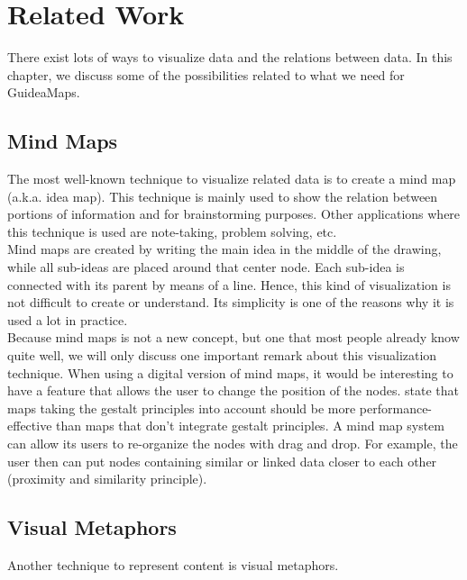 \chapter{Related Work}\label{ch:related-work}

There exist lots of ways to visualize data and the relations between data. In this chapter, we discuss some of the possibilities related to what we need for GuideaMaps.

\section{Mind Maps}
The most well-known technique to visualize related data is to create a mind map (a.k.a. idea map). This technique is mainly used to show the relation between portions of information and for brainstorming purposes. Other applications where this technique is used are note-taking, problem solving, etc. \citep{knowledgemapsbalaid} \\

Mind maps are created by writing the main idea in the middle of the drawing, while all sub-ideas are placed around that center node. Each sub-idea is connected with its parent by means of a line. Hence, this kind of visualization is not difficult to create or understand. Its simplicity is one of the reasons why it is used a lot in practice.\\

Because mind maps is not a new concept, but one that most people already know quite well, we will only discuss one important remark about this visualization technique. When using a digital version of mind maps, it would be interesting to have a feature that allows the user to change the position of the nodes. \cite{wiegmann-1992} state that maps taking the gestalt principles into account should be more performance-effective than maps that don't integrate gestalt principles. A mind map system can allow its users to re-organize the nodes with drag and drop. For example, the user then can put nodes containing similar or linked data closer to each other (proximity and similarity principle).



\section{Visual Metaphors}
Another technique to represent content is visual metaphors.

